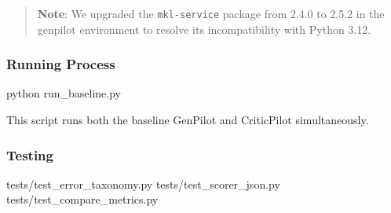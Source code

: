 \documentclass[
]{article}
\newenvironment{Shaded}{}{}
\newcommand{\ExtensionTok}[1]{#1}
\newcommand{\NormalTok}[1]{#1}
\begin{document}
\begin{quote}
\textbf{Note}: We upgraded the \texttt{mkl-service} package from 2.4.0
to 2.5.2 in the genpilot environment to resolve its incompatibility with
Python 3.12.
\end{quote}

\subsubsection{Running Process}\label{running-process}

\begin{Shaded}
\begin{Highlighting}[]
\ExtensionTok{python}\NormalTok{ run\_baseline.py}
\end{Highlighting}
\end{Shaded}

This script runs both the baseline GenPilot and CriticPilot
simultaneously.

\subsubsection{Testing}\label{testing}

\begin{Shaded}
\begin{Highlighting}[]
\ExtensionTok{tests/test\_error\_taxonomy.py}
\ExtensionTok{tests/test\_scorer\_json.py}
\ExtensionTok{tests/test\_compare\_metrics.py}
\end{Highlighting}
\end{Shaded}
\end{document}
